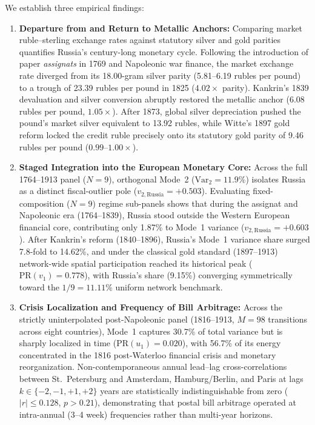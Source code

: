 \documentclass[11pt,a4paper]{article}
\begin{document}
We establish three empirical findings:
\begin{enumerate}
    \item \textbf{Departure from and Return to Metallic Anchors:} Comparing market ruble--sterling exchange rates against statutory silver and gold parities quantifies Russia's century-long monetary cycle. Following the introduction of paper \emph{assignats} in 1769 and Napoleonic war finance, the market exchange rate diverged from its 18.00-gram silver parity (5.81--6.19 rubles per pound) to a trough of 23.39 rubles per pound in 1825 ($4.02\times$ parity). Kankrin's 1839 devaluation and silver conversion abruptly restored the metallic anchor (6.08 rubles per pound, $1.05\times$). After 1873, global silver depreciation pushed the pound's market silver equivalent to 13.92 rubles, while Witte's 1897 gold reform locked the credit ruble precisely onto its statutory gold parity of 9.46 rubles per pound ($0.99\text{--}1.00\times$).
    \item \textbf{Staged Integration into the European Monetary Core:} Across the full 1764--1913 panel ($N=9$), orthogonal Mode~2 ($\mathrm{Var}_2 = 11.9\%$) isolates Russia as a distinct fiscal-outlier pole ($v_{2,\mathrm{Russia}} = +0.503$). Evaluating fixed-composition ($N=9$) regime sub-panels shows that during the assignat and Napoleonic era (1764--1839), Russia stood outside the Western European financial core, contributing only 1.87\% to Mode~1 variance ($v_{2,\mathrm{Russia}} = +0.603$). After Kankrin's reform (1840--1896), Russia's Mode~1 variance share surged 7.8-fold to 14.62\%, and under the classical gold standard (1897--1913) network-wide spatial participation reached its historical peak ($\mathrm{PR}(v_1) = 0.778$), with Russia's share (9.15\%) converging symmetrically toward the $1/9 = 11.11\%$ uniform network benchmark.
    \item \textbf{Crisis Localization and Frequency of Bill Arbitrage:} Across the strictly uninterpolated post-Napoleonic panel (1816--1913, $M = 98$ transitions across eight countries), Mode~1 captures 30.7\% of total variance but is sharply localized in time ($\mathrm{PR}(u_1) = 0.020$), with 56.7\% of its energy concentrated in the 1816 post-Waterloo financial crisis and monetary reorganization. Non-contemporaneous annual lead--lag cross-correlations between St.~Petersburg and Amsterdam, Hamburg/Berlin, and Paris at lags $k \in \{-2, -1, +1, +2\}$ years are statistically indistinguishable from zero ($|r| \le 0.128$, $p > 0.21$), demonstrating that postal bill arbitrage operated at intra-annual (3--4 week) frequencies rather than multi-year horizons.
\end{enumerate}
\end{document}
